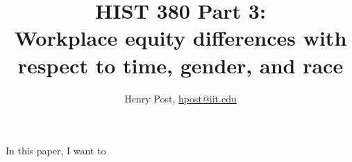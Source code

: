 \documentclass[a4paper,12pt]{article}
\title{HIST 380 Part 3: \\ Workplace equity differences with \\ respect to time, gender, and race }
\author{Henry Post, \url{hpost@iit.edu}}
\begin{document}
\maketitle

\newpage
\doublespacing

In this paper, I want to

\newpage
\singlespacing

\begin{thebibliography}{9}


\end{thebibliography}

\newpage

\end{document}
